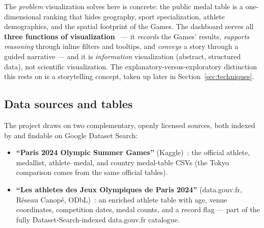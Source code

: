 \documentclass[11pt]{article}
\begin{document}
The \emph{problem} visualization solves here is concrete: the public medal table
is a one-dimensional ranking that hides geography, sport specialization, athlete
demographics, and the spatial footprint of the Games. The dashboard serves all
\textbf{three functions of visualization}~\cite{card1999} --- it \emph{records}
the Games' results, \emph{supports reasoning} through inline filters and tooltips,
and \emph{conveys} a story through a guided narrative --- and it is
\emph{information} visualization (abstract, structured data), not scientific
visualization. The explanatory-versus-exploratory distinction this rests on is a
storytelling concept, taken up later in Section~\ref{sec:techniques}.

\subsection{Data sources and tables}
The project draws on two complementary, openly licensed sources, both indexed by
and findable on Google Dataset Search:

\begin{itemize}
  \item \textbf{``Paris 2024 Olympic Summer Games''} (Kaggle)~\cite{kaggle2024}:
        the official athlete, medallist, athlete--medal, and country medal-table
        CSVs (the Tokyo comparison comes from the same official tables).
  \item \textbf{``Les athletes des Jeux Olympiques de Paris 2024''} (data.gouv.fr,
        R\'eseau Canop\'e, ODbL)~\cite{datagouv}: an enriched athlete table with age,
        venue coordinates, competition dates, medal counts, and a record flag ---
        part of the fully Dataset-Search-indexed data.gouv.fr catalogue.
\end{itemize}
\end{document}

